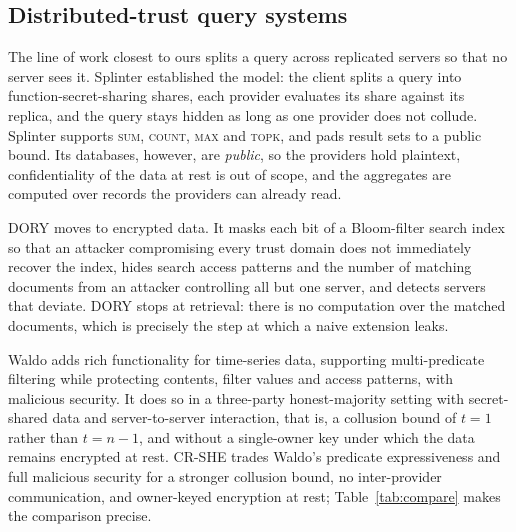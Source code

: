 \documentclass[a4paper,fleqn]{cas-sc}
\begin{document}
\subsection{Distributed-trust query systems}
The line of work closest to ours splits a query across replicated servers so
that no server sees it. Splinter \citep{splinter} established the model: the
client splits a query into function-secret-sharing shares, each provider
evaluates its share against its replica, and the query stays hidden as long as
one provider does not collude. Splinter supports \textsc{sum}, \textsc{count},
\textsc{max} and \textsc{topk}, and pads result sets to a public bound. Its
databases, however, are \emph{public}, so the providers hold plaintext,
confidentiality of the data at rest is out of scope, and the aggregates are
computed over records the providers can already read.

DORY \citep{dory} moves to encrypted data. It masks each bit of a
Bloom-filter search index so that an attacker compromising every trust domain
does not immediately recover the index, hides search access patterns and the
number of matching documents from an attacker controlling all but one server,
and detects servers that deviate. DORY stops at retrieval: there is no
computation over the matched documents, which is precisely the step at which a
naive extension leaks.

Waldo \citep{waldo} adds rich functionality for time-series data, supporting
multi-predicate filtering while protecting contents, filter values and access
patterns, with malicious security. It does so in a three-party honest-majority
setting with secret-shared data and server-to-server interaction, that is, a
collusion bound of $t=1$ rather than $t=n-1$, and without a single-owner key
under which the data remains encrypted at rest. CR-SHE trades Waldo's
predicate expressiveness and full malicious security for a stronger collusion
bound, no inter-provider communication, and owner-keyed encryption at rest;
Table~\ref{tab:compare} makes the comparison precise.
\end{document}
